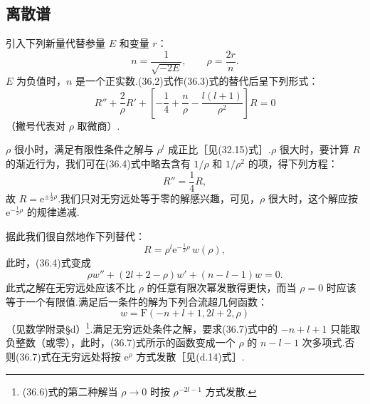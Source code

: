 \subsection*{离散谱}

引入下列新量代替参量 $E$ 和变量 $r$：
\begin{equation}
  n=\frac{1}{\sqrt{-2E}},\qquad\rho=\frac{2r}{n}.
\end{equation}
$E$ 为负值时，$n$ 是一个正实数.(36.2)式作(36.3)式的替代后呈下列形式：
\begin{equation}
  R''+\frac{2}{\rho}R'
  +\left[-\frac{1}{4}+\frac{n}{\rho}-\frac{l(l+1)}{\rho^2}\right]R=0
\end{equation}
（撇号代表对 $\rho$ 取微商）.

$\rho$ 很小时，满足有限性条件之解与 $\rho^l$ 成正比［见(32.15)式］.$\rho$ 很大时，要计算 $R$ 的渐近行为，我们可在(36.4)式中略去含有 $1/\rho$ 和 $1/\rho^2$ 的项，得下列方程：
\begin{equation*}
  R''=\frac{1}{4}R,
\end{equation*}
故 $R=\mathrm{e}^{\pm\frac{1}{2}\rho}$.我们只对无穷远处等于零的解感兴趣，可见，$\rho$ 很大时，这个解应按 $\mathrm{e}^{-\frac{1}{2}\rho}$ 的规律递减.

据此我们很自然地作下列替代：
\begin{equation}
  R=\rho^l\mathrm{e}^{-\frac{1}{2}\rho}\,w(\rho),
\end{equation}
此时，(36.4)式变成
\begin{equation}
  \rho w''+(2l+2-\rho)w'+(n-l-1)w=0.
\end{equation}
此式之解在无穷远处应该不比 $\rho$ 的任意有限次幂发散得更快，而当 $\rho=0$ 时应该等于一个有限值.满足后一条件的解为下列合流超几何函数：
\begin{equation}
  w=\mathrm{F}(-n+l+1,2l+2,\rho)
\end{equation}
（见数学附录§d）\footnote{(36.6)式的第二种解当 $\rho\to0$ 时按 $\rho^{-2l-1}$ 方式发散.}.满足无穷远处条件之解，要求(36.7)式中的 $-n+l+1$ 只能取负整数（或零），此时，(36.7)式所示的函数变成一个 $\rho$ 的 $n-l-1$ 次多项式.否则(36.7)式在无穷远处将按 $\mathrm{e}^{\rho}$ 方式发散［见(d.14)式］.

